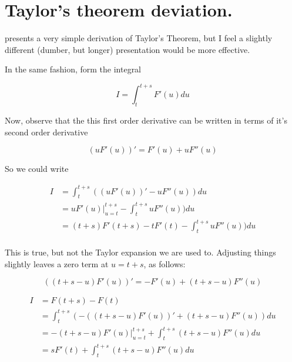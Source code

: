 
%


\chapter{Taylor's theorem deviation.}

%


\cite{hestenes1999nfc} presents a very simple derivation of Taylor's Theorem,
but I feel a
slightly different (dumber, but longer) presentation would be more effective.

In the same fashion, form the integral

\[
I = \int_{t}^{t+s} F'(u) du
\]

Now, observe that the this first order derivative can be written in
terms of it's second order derivative

\[
(u F'(u))' = F'(u) + u F''(u)
\]

So we could write

\begin{align*}
I &= \int_{t}^{t+s} ((u F'(u))' - u F''(u)) du \\
  &= {u F'(u)} \vert_{u=t}^{t+s} - \int_{t}^{t+s} u F''(u)) du \\
  &= (t+s) F'(t+s) - t F'(t) - \int_{t}^{t+s} u F''(u)) du \\
\end{align*}

This is true, but not the Taylor expansion we are used to.  Adjusting things slightly leaves a zero term at $u=t+s$, as follows:

\[
\left((t + s - u) F'(u)\right)' = -F'(u) + (t+s-u) F''(u)
\]

\begin{align*}
I &= F(t+s) - F(t) \\
 &= \int_{t}^{t+s} ( - ((t + s - u) F'(u))' + (t+s-u) F''(u) ) du \\
 &= - {(t + s - u) F'(u)} \vert_{u=t}^{t+s} + \int_{t}^{t+s} (t+s-u) F''(u) du \\
 &= s F'(t) + \int_{t}^{t+s} (t+s-u) F''(u) du \\
\end{align*}

